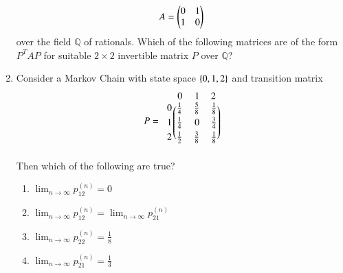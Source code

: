 \begin{enumerate}[label=\thesection.\arabic*.,ref=\thesection.\theenumi]
\begin{align}
A = \begin{pmatrix}0 & 1 \\ 1 & 0\end{pmatrix}
\end{align}
over the field $\mathbb{Q}$ of rationals.  Which of the following matrices are of the form $P^TAP$ for suitable $2\times 2$ invertible matrix $P$ over $\mathbb{Q}$?
\begin{enumerate}
\end{enumerate}
\item Consider a Markov Chain with state space $\left\{0,1,2\right\}$ and transition matrix
\begin{align}
P = 
\begin{blockarray}{c@{\hspace{1pt}}rrr@{\hspace{3pt}}}
         & 0   & 1   & 2 \\
        \begin{block}{r@{\hspace{3pt}}@{\hspace{1pt}}
    (@{\hspace{1pt}}rrr@{\hspace{1pt}}@{\hspace{1pt}})}
        0 & \frac{1}{4} & \frac{5}{8} & \frac{1}{8}  \\[1mm]
        1 & \frac{1}{4} & 0 & \frac{3}{4}  \\[1mm]
        2 &  \frac{1}{2} & \frac{3}{8} & \frac{1}{8}  \\
        \end{block}
    \end{blockarray}
\end{align}
Then which of the following are true?
\begin{enumerate}
\item $\lim_{n \to \infty} p_{12}^{(n)} = 0$
\item $\lim_{n \to \infty} p_{12}^{(n)} = \lim_{n \to \infty} p_{21}^{(n)}$
\item $\lim_{n \to \infty} p_{22}^{(n)} = \frac{1}{8}$
\item $\lim_{n \to \infty} p_{21}^{(n)} = \frac{1}{3}$
\end{enumerate}
\end{enumerate}

